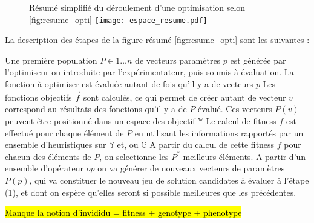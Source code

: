 

\begin{figure}[!ht]
	\begin{sidecaption}[fortoc]{Résumé simplifié du déroulement d'une optimisation selon \textcite[109]{Weise2011}}[fig:resume_opti]
		\centering
		\texttt{[image: espace\_resume.pdf]}{
		}
  \end{sidecaption}
\end{figure}

La description des étapes de la figure résumé \ref{fig:resume_opti} sont les suivantes :

\begin{itemize}[label=\textbullet]
	 Une première population $P \in {1 \dotsc n}$ de vecteurs paramètres ${p}$ est générée par l'optimiseur ou introduite par l'expérimentateur, puis soumis à évaluation.
	 La fonction à optimiser est évaluée autant de fois qu'il y a de vecteurs ${p}$ 
	 Les fonctions objectifs $\vec{f}$ sont calculés, ce qui permet de créer autant de vecteur ${v}$ correspond au résultats des fonctions qu'il y a de $P$ évalué. Ces vecteurs $P(v)$ peuvent être positionné dans un espace des objectif $\mathbb{Y}$ 
	 Le calcul de fitness $f$ est effectué pour chaque élément de $P$ en utilisant les informations rapportés par un ensemble d'heuristiques sur $\mathbb{Y}$ et, ou $\mathbb{G}$
	 A partir du calcul de cette fitness $f$ pour chacun des éléments de $P$, on selectionne les $P^*$ meilleurs éléments.
	 A partir d'un ensemble d'opérateur ${op}$ on va générer de nouveaux vecteurs de paramètres $P(p)$, qui va constituer le nouveau jeu de solution candidates à évaluer à l'étape (1), et dont on espère qu'elles seront si possible meilleures que les précédentes.
\end{itemize}

\hl{Manque la notion d'invididu = fitness + genotype + phenotype}





